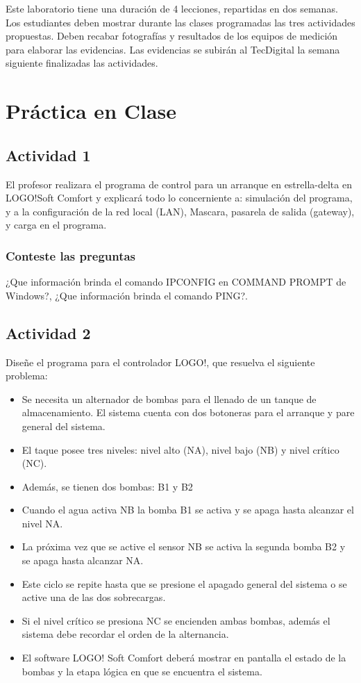 Este laboratorio tiene una duración de 4 lecciones, repartidas en dos semanas. Los estudiantes deben mostrar durante las clases programadas las tres actividades propuestas. Deben recabar fotografías y resultados de los equipos de medición para elaborar las evidencias. Las evidencias se subirán al TecDigital la semana siguiente finalizadas las actividades.

\section{Práctica en Clase}

\subsection{Actividad 1}

	El profesor realizara el programa de control para un arranque en estrella-delta en LOGO!Soft Comfort y explicará todo lo concerniente a: simulación del programa, y a la configuración de la red local (LAN), Mascara, pasarela de salida (gateway), y carga en el programa. 
	
 \subsubsection{Conteste las preguntas}
 	¿Que información brinda el comando IPCONFIG en COMMAND PROMPT de Windows?, ¿Que información brinda el comando PING?.  

\subsection{Actividad 2}

Diseñe el programa para el controlador LOGO!, que resuelva el siguiente problema:

\begin{itemize}
	\item Se necesita un alternador de bombas  para el llenado de un tanque de almacenamiento. El sistema cuenta con dos botoneras para el arranque y pare general del sistema.
	\item El taque posee tres niveles: nivel alto (NA), nivel bajo (NB) y nivel crítico (NC).
	\item Además, se tienen dos bombas: B1 y B2
	\item Cuando el agua activa NB la bomba B1 se activa y se apaga hasta alcanzar el nivel NA.
	\item La próxima vez que se active el sensor NB se activa la segunda bomba B2 y se apaga hasta alcanzar NA.
	\item Este ciclo se repite hasta que se presione el apagado general del sistema o se active una de las dos sobrecargas.
	\item Si el nivel crítico se presiona NC se encienden ambas bombas, además el sistema debe  recordar el orden de la alternancia.
	\item El software LOGO! Soft Comfort deberá mostrar en pantalla el estado de la bombas y la etapa lógica en que se encuentra el sistema.
\end{itemize}
     
